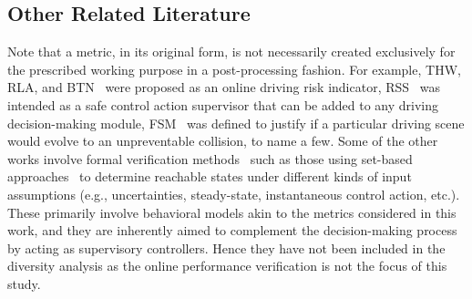 \documentclass[journal]{IEEEtran}
\begin{document}
\subsection{Other Related Literature}\label{sec:oliterature}
Note that a metric, in its original form, is not necessarily created exclusively for the prescribed working purpose in a post-processing fashion. For example, THW, RLA, and BTN~\cite{Jansson2005CollisionAT} were proposed as an online driving risk indicator, RSS~\cite{shalev2017formal} was intended as a safe control action supervisor that can be added to any driving decision-making module, FSM~\cite{mattas2020fuzzy} was defined to justify if a particular driving scene would evolve to an unpreventable collision, to name a few. Some of the other works involve formal verification methods~\cite{mitra2021verifying, meng2022learning} such as those using set-based approaches~\cite{althoff2014online, klischat2019generating} to determine reachable states under different kinds of input assumptions (e.g., uncertainties, steady-state, instantaneous control action, etc.). These primarily involve behavioral models akin to the metrics considered in this work, and they are inherently aimed to complement the decision-making process by acting as supervisory controllers. Hence they have not been included in the diversity analysis as the online performance verification is not the focus of this study.
\end{document}
